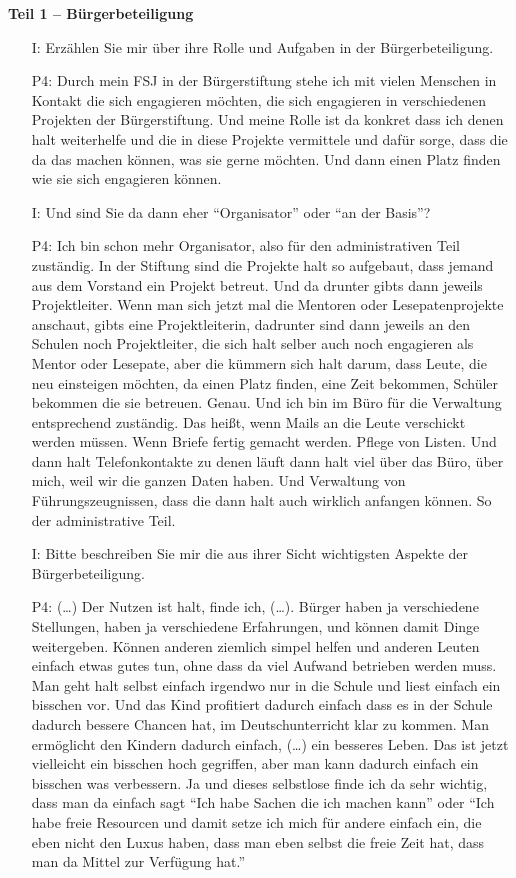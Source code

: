 \textbf{Teil 1 -- B{\"u}rgerbeteiligung}
\begin{itemize}
    \item[I:] Erz{\"a}hlen Sie mir {\"u}ber ihre Rolle und Aufgaben in der B{\"u}rgerbeteiligung.
    \item[P4:] Durch mein FSJ in der B{\"u}rgerstiftung stehe ich mit vielen Menschen in Kontakt die sich engagieren m{\"o}chten, die sich engagieren in verschiedenen Projekten der B{\"u}rgerstiftung. Und meine Rolle ist da konkret dass ich denen halt weiterhelfe und die in diese Projekte vermittele und daf{\"u}r sorge, dass die da das machen k{\"o}nnen, was sie gerne m{\"o}chten. Und dann einen Platz finden wie sie sich engagieren k{\"o}nnen.
    \item[I:] Und sind Sie da dann eher "`Organisator"' oder "`an der Basis"'?
    \item[P4:] Ich bin schon mehr Organisator, also f{\"u}r den administrativen Teil zust{\"a}ndig. In der Stiftung sind die Projekte halt so aufgebaut, dass jemand aus dem Vorstand ein Projekt betreut. Und da drunter gibts dann jeweils Projektleiter. Wenn man sich jetzt mal die Mentoren oder Lesepatenprojekte anschaut, gibts eine Projektleiterin, dadrunter sind dann jeweils an den Schulen noch Projektleiter, die sich halt selber auch noch engagieren als Mentor oder Lesepate, aber die k{\"u}mmern sich halt darum, dass Leute, die neu einsteigen m{\"o}chten, da einen Platz finden, eine Zeit bekommen, Sch{\"u}ler bekommen die sie betreuen. Genau. Und ich bin im B{\"u}ro f{\"u}r die Verwaltung entsprechend zust{\"a}ndig. Das hei{\ss}t, wenn Mails an die Leute verschickt werden m{\"u}ssen. Wenn Briefe fertig gemacht werden. Pflege von Listen. Und dann halt Telefonkontakte zu denen l{\"a}uft dann halt viel {\"u}ber das B{\"u}ro, {\"u}ber mich, weil wir die ganzen Daten haben. Und Verwaltung von F{\"u}hrungszeugnissen, dass die dann halt auch wirklich anfangen k{\"o}nnen. So der administrative Teil.
    \item[I:] Bitte beschreiben Sie mir die aus ihrer Sicht wichtigsten Aspekte der B{\"u}rgerbeteiligung.
    \item[P4:] (\dots) Der Nutzen ist halt, finde ich, (\dots). B{\"u}rger haben ja verschiedene Stellungen, haben ja verschiedene Erfahrungen, und k{\"o}nnen damit Dinge weitergeben. K{\"o}nnen anderen ziemlich simpel helfen und anderen Leuten einfach etwas gutes tun, ohne dass da viel Aufwand betrieben werden muss. Man geht halt selbst einfach irgendwo nur in die Schule und liest einfach ein bisschen vor. Und das Kind profitiert dadurch einfach dass es in der Schule dadurch bessere Chancen hat, im Deutschunterricht klar zu kommen. Man erm{\"o}glicht den Kindern dadurch einfach, (\dots) ein besseres Leben. Das ist jetzt vielleicht ein bisschen hoch gegriffen, aber man kann dadurch einfach ein bisschen was verbessern. Ja und dieses selbstlose finde ich da sehr wichtig, dass man da einfach sagt "`Ich habe Sachen die ich machen kann"' oder "`Ich habe freie Resourcen und damit setze ich mich f{\"u}r andere einfach ein, die eben nicht den Luxus haben, dass man eben selbst die freie Zeit hat, dass man da Mittel zur Verf{\"u}gung hat."'

\end{itemize}
